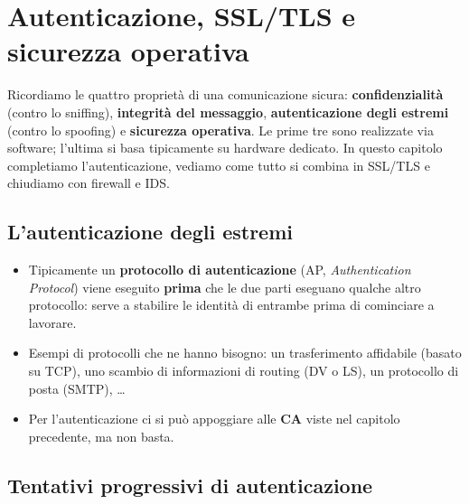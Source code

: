 \chapter{Autenticazione, SSL/TLS e sicurezza operativa}

Ricordiamo le quattro proprietà di una comunicazione sicura: \textbf{confidenzialità} (contro lo sniffing), \textbf{integrità del
messaggio}, \textbf{autenticazione degli estremi} (contro lo spoofing) e \textbf{sicurezza operativa}. Le prime tre sono realizzate via
software; l'ultima si basa tipicamente su hardware dedicato. In questo capitolo completiamo l'autenticazione, vediamo come tutto si
combina in SSL/TLS e chiudiamo con firewall e IDS.

\section{L'autenticazione degli estremi}


\begin{itemize}
    \item Tipicamente un \textbf{protocollo di autenticazione} (AP, \emph{Authentication Protocol}) viene eseguito \textbf{prima} che le due
          parti eseguano qualche altro protocollo: serve a stabilire le identità di entrambe prima di cominciare a lavorare.
    \item Esempi di protocolli che ne hanno bisogno: un trasferimento affidabile (basato su TCP), uno scambio di informazioni di routing (DV o
          LS), un protocollo di posta (SMTP), \dots
    \item Per l'autenticazione ci si può appoggiare alle \textbf{CA} viste nel capitolo precedente, ma non basta.
\end{itemize}

\section{Tentativi progressivi di autenticazione}


